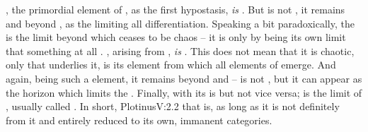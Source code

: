 , the primordial element of , as the first hypostasis,
{\em is} . But  is not , it remains  and
beyond , as the  limiting all differentiation.
Speaking a bit paradoxically, the  is the limit beyond which 
ceases to be chaos -- it is only by being its own limit that something at all
.  , arising from , {\em is} . This
does not mean that it is chaotic, only that  underlies it, is its
 element from which all elements of  emerge. And
again, being such a  element, it remains beyond and 
 --  is not , but it can appear as the
horizon which limits the . Finally, 
with its  is  but not vice versa;
 is the limit of , usually called . In short, \citet{there is from the first principle to ultimate an
  outgoing in which unfailingly each principle retains its own seat while its
  off-shot takes another rank, a lower, though on the other hand every being is
  in identity with its prior as long as it holds that contact}{Plotinus}{V:2.2}
that is, as long as it is not definitely  from it and entirely
reduced to its own, immanent categories.


